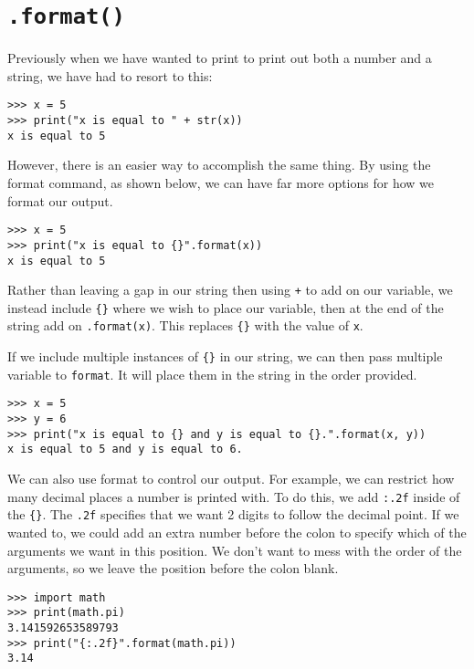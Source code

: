 \documentclass[11pt,hidelinks]{article}
\begin{document}
\pagebreak
\section{\texttt{.format()}}
Previously when we have wanted to print to print out both a number and a string, we have had to resort to this:

\begin{lstlisting}[style=ipython]
>>> x = 5
>>> print("x is equal to " + str(x))
x is equal to 5
\end{lstlisting}

However, there is an easier way to accomplish the same thing. By using the format command, as shown below, we can have far more options for how we format our output.

\begin{lstlisting}[style=ipython]
>>> x = 5
>>> print("x is equal to {}".format(x))
x is equal to 5
\end{lstlisting}

Rather than leaving a gap in our string then using \lstinline{+} to add on our variable, we instead include \lstinline!{}! where we wish to place our variable, then at the end of the string add on \lstinline{.format(x)}. This replaces \lstinline!{}! with the value of \lstinline{x}.

If we include multiple instances of \lstinline!{}! in our string, we can then pass multiple variable to \lstinline{format}. It will place them in the string in the order provided.

\begin{lstlisting}[style=ipython]
>>> x = 5
>>> y = 6
>>> print("x is equal to {} and y is equal to {}.".format(x, y))
x is equal to 5 and y is equal to 6.
\end{lstlisting}

We can also use format to control our output. For example, we can restrict how many decimal places a number is printed with. To do this, we add \lstinline{:.2f} inside of the \lstinline!{}!. The \lstinline{.2f} specifies that we want 2 digits to follow the decimal point. If we wanted to, we could add an extra number before the colon to specify which of the arguments we want in this position. We don't want to mess with the order of the arguments, so we leave the position before the colon blank.

\begin{lstlisting}[style=ipython]
>>> import math
>>> print(math.pi)
3.141592653589793
>>> print("{:.2f}".format(math.pi))
3.14
\end{lstlisting}
\end{document}
